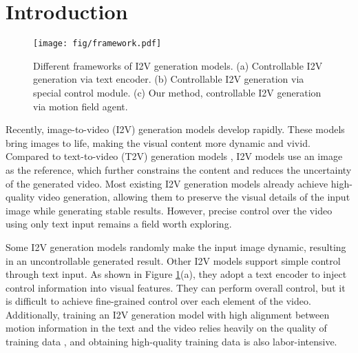 \section{Introduction}
\label{sec:introduction}

\begin{figure}[t]
\centering
\texttt{[image: fig/framework.pdf]}
\caption{Different frameworks of I2V generation models. (a) Controllable I2V generation via text encoder. (b) Controllable I2V generation via special control module. (c) Our method, controllable I2V generation via motion field agent.}
\label{fig:framework}
\end{figure}

Recently, image-to-video (I2V) generation models \cite{chen2023videocrafter1,dai2023animateanything,zhang2023i2vgen,guo2024i2v,ren2024consisti2v,xing2025dynamicrafter,zhang2024moonshot,ma2024cinemo,blattmann2023stable,ma2024follow,jin2024pyramidal,yang2024cogvideox} develop rapidly. These models bring images to life, making the visual content more dynamic and vivid. Compared to text-to-video (T2V) generation models \cite{ho2022video,ho2022imagen,singer2022make,ge2023preserve,mei2023vidm,he2022latent,an2023latent,blattmann2023align,guo2023animatediff}, I2V models use an image as the reference, which further constrains the content and reduces the uncertainty of the generated video. Most existing I2V generation models already achieve high-quality video generation, allowing them to preserve the visual details of the input image while generating stable results. However, precise control over the video using only text input remains a field worth exploring.

Some I2V generation models \cite{guo2024i2v,blattmann2023stable} randomly make the input image dynamic, resulting in an uncontrollable generated result. Other I2V models \cite{xing2025dynamicrafter,zhang2023i2vgen,ren2024consisti2v,dai2023animateanything,zhang2024moonshot,ma2024cinemo,ma2024follow} support simple control through text input. As shown in Figure \ref{fig:framework}(a), they adopt a text encoder to inject control information into visual features. They can perform overall control, but it is difficult to achieve fine-grained control over each element of the video. Additionally, training an I2V generation model with high alignment between motion information in the text and the video relies heavily on the quality of training data \cite{bain2021frozen,xue2022advancing,wang2023internvid,chen2024panda,tan2024vidgen}, and obtaining high-quality training data is also labor-intensive.

